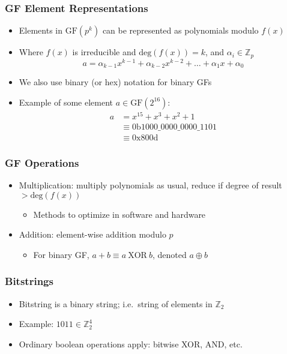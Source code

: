 \begin{frame}
\frametitle{GF Element Representations}
\begin{itemize}
  \item Elements in $\mathrm{GF}(p^k)$ can be represented as polynomials modulo $f(x)$
  \item Where $f(x)$ is irreducible and $\mathrm{deg}(f(x)) = k$, and $\alpha_i \in \mathbb{Z}_p$
  \begin{equation*}
    a = \alpha_{k-1}x^{k-1} + \alpha_{k-2}x^{k-2} + \ldots + \alpha_1 x + \alpha_0
  \end{equation*}
  \item We also use binary (or hex) notation for binary GFs
  \item Example of some element $a \in \mathrm{GF}(2^{16})$:
  \begin{align*}
    a &= x^{15} + x^3 + x^2 + 1 \\
      &\equiv \mathrm{0b1000\_0000\_0000\_1101} \\
      &\equiv \mathrm{0x800d}
  \end{align*}
\end{itemize}
\end{frame}

\begin{frame}
\frametitle{GF Operations}
\begin{itemize}
  \item Multiplication: multiply polynomials as usual, reduce if degree of result $> \mathrm{deg}(f(x))$
  \begin{itemize}
    \item Methods to optimize in software and hardware
  \end{itemize}
  \item Addition: element-wise addition modulo $p$
  \begin{itemize}
    \item For binary GF, $a + b \equiv a \mathrm{\ XOR\ } b$, denoted $a \oplus b$
  \end{itemize}
\end{itemize}
\end{frame}

\begin{frame}
\frametitle{Bitstrings}
\begin{itemize}
  \item Bitstring is a binary string; i.e.\ string of elements in $\mathbb{Z}_2$
  \item Example: $1011 \in \mathbb{Z}_2^4$
  \item Ordinary boolean operations apply: bitwise XOR, AND, etc.
\end{itemize}
\end{frame}

